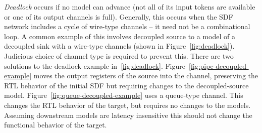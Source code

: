 \emph{Deadlock} occurs if no model can advance (not all of its input tokens are
available or one of its output channels is full). Generally, this occurs when
the SDF network includes a cycle of wire-type channels -- it need not be a
combinational loop.  A common example of this involves decoupled source to a
model of a decoupled sink with a wire-type channels (shown in
Figure~\ref{fig:deadlock}). Judicious choice of channel type is required to
prevent this. There are two solutions to the deadlock example
in~\ref{fig:deadlock}.  Figure~\ref{fig:pipe-decoupled-example} moves the
output registers of the source into the channel, preserving the RTL behavior of
the initial SDF but requiring changes to the decoupled-source model.
Figure~\ref{fig:queue-decoupled-example} uses a queue-type channel. This
changes the RTL behavior of the target, but requires no changes to the models.
Assuming downstream models are latency insensitive this should not change the
functional behavior of the target.


